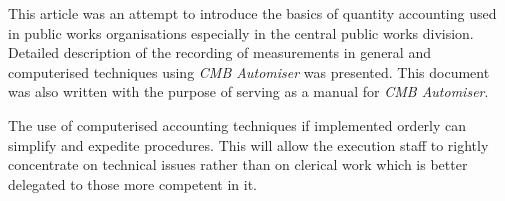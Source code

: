 \documentclass[twoside,a4paper]{refart}
\begin{document}
	 This article was an attempt to introduce the basics of quantity accounting used in public works organisations especially in the central public works division. Detailed description of the recording of measurements in general and computerised techniques using \emph{CMB Automiser} was presented. This document was also written with the purpose of serving as a manual for \emph{CMB Automiser}. 
	 
	 The use of computerised accounting techniques if implemented orderly can simplify and expedite procedures. This will allow the execution staff to rightly concentrate on technical issues rather than on clerical work which is better delegated to those more competent in it.
	 
\end{document}
